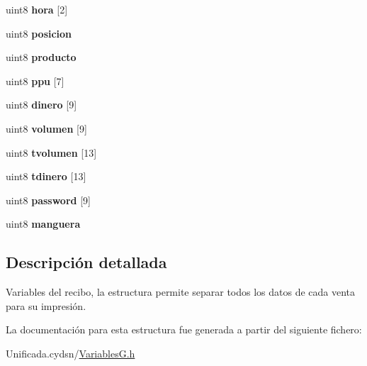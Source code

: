 \begin{DoxyCompactItemize}
\mbox{\label{structrecibo_af03a13ef1dcc15bc76419be49b3e8401}} 
uint8 {\bfseries hora} \mbox{[}2\mbox{]}
\item 
\mbox{\label{structrecibo_a8388ec4ace5d12986a5f180d2ca69210}} 
uint8 {\bfseries posicion}
\item 
\mbox{\label{structrecibo_a0e25b4b82ec95f2b7c0c98ea0c13e834}} 
uint8 {\bfseries producto}
\item 
\mbox{\label{structrecibo_a174dd8047f2ee159579d40fc075b79bc}} 
uint8 {\bfseries ppu} \mbox{[}7\mbox{]}
\item 
\mbox{\label{structrecibo_a2173ebbc29e179804435dfe6131d71de}} 
uint8 {\bfseries dinero} \mbox{[}9\mbox{]}
\item 
\mbox{\label{structrecibo_ab6097b4f6a2ab687ab7be4ff96b549b2}} 
uint8 {\bfseries volumen} \mbox{[}9\mbox{]}
\item 
\mbox{\label{structrecibo_ae2b311e1ea4f046c439cf06e0fcc3054}} 
uint8 {\bfseries tvolumen} \mbox{[}13\mbox{]}
\item 
\mbox{\label{structrecibo_aa8a7bb931aad124fb0d136db7747edd5}} 
uint8 {\bfseries tdinero} \mbox{[}13\mbox{]}
\item 
\mbox{\label{structrecibo_abeabd3e6083f7fd6f6b18b950ab9904b}} 
uint8 {\bfseries password} \mbox{[}9\mbox{]}
\item 
\mbox{\label{structrecibo_a44063ee06b57fe21bcd41b22f2500ce4}} 
uint8 {\bfseries manguera}
\end{DoxyCompactItemize}


\subsection{Descripción detallada}
Variables del recibo, la estructura permite separar todos los datos de cada venta para su impresión. 

La documentación para esta estructura fue generada a partir del siguiente fichero\+:\begin{DoxyCompactItemize}
\item 
Unificada.\+cydsn/\mbox{\hyperlink{_variables_g_8h}{Variables\+G.\+h}}\end{DoxyCompactItemize}
